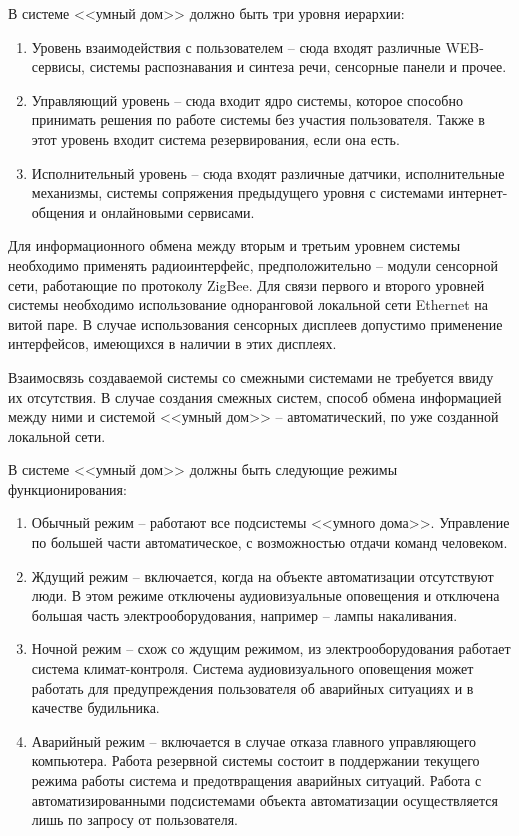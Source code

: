 \documentclass[a4paper, 12pt, titlepage]{article}
\begin{document}
В системе <<умный дом>> должно быть три уровня иерархии:
\begin{enumerate}
\item Уровень взаимодействия с пользователем -- сюда входят различные WEB-сервисы, системы распознавания и 
синтеза речи, сенсорные панели и прочее.
\item Управляющий уровень -- сюда входит ядро системы, которое способно принимать решения по работе системы 
без участия пользователя. Также в этот уровень входит система резервирования, если она есть.
\item Исполнительный уровень -- сюда входят различные датчики, исполнительные механизмы, системы сопряжения 
предыдущего уровня с системами интернет-общения и онлайновыми сервисами.
\end{enumerate}

Для информационного обмена между вторым и третьим уровнем системы необходимо применять радиоинтерфейс, предположительно -- 
модули сенсорной сети, работающие по протоколу ZigBee. Для связи первого и второго уровней системы необходимо использование 
одноранговой локальной сети Ethernet на витой паре. В случае использования сенсорных дисплеев допустимо применение интерфейсов, 
имеющихся в наличии в этих дисплеях.

Взаимосвязь создаваемой системы со смежными системами не требуется ввиду их отсутствия. В случае создания смежных систем, способ 
обмена информацией между ними и системой <<умный дом>> -- автоматический, по уже созданной локальной сети.

В системе <<умный дом>> должны быть следующие режимы функционирования:
\begin{enumerate}
\item Обычный режим -- работают все подсистемы <<умного дома>>. Управление по большей части автоматическое, с возможностью 
отдачи команд человеком.
\item Ждущий режим -- включается, когда на объекте автоматизации отсутствуют люди. В этом режиме отключены аудиовизуальные 
оповещения и отключена большая часть электрооборудования, например -- лампы накаливания.
\item Ночной режим -- схож со ждущим режимом, из электрооборудования работает система климат-контроля. Система аудиовизуального 
оповещения может работать для предупреждения пользователя об аварийных ситуациях и в качестве будильника.
\item Аварийный режим -- включается в случае отказа главного управляющего компьютера. Работа резервной системы 
состоит в поддержании текущего режима работы система и предотвращения аварийных ситуаций. Работа с автоматизированными 
подсистемами объекта автоматизации осуществляется лишь по запросу от пользователя.
\end{enumerate}
\end{document}
